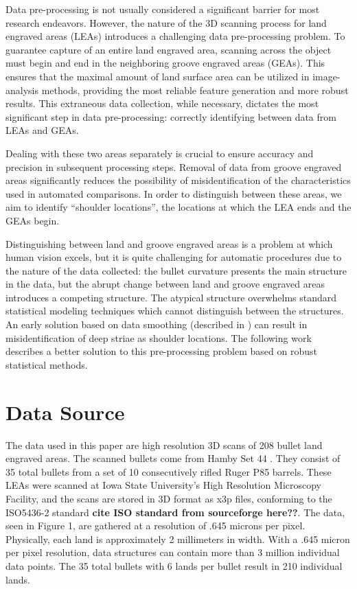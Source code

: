 \documentclass[]{article}
\begin{document}
Data pre-processing is not usually considered a significant barrier for
most research endeavors. However, the nature of the 3D scanning process
for land engraved areas (LEAs) introduces a challenging data
pre-processing problem. To guarantee capture of an entire land engraved
area, scanning across the object must begin and end in the neighboring
groove engraved areas (GEAs). This ensures that the maximal amount of
land surface area can be utilized in image-analysis methods, providing
the most reliable feature generation and more robust results. This
extraneous data collection, while necessary, dictates the most
significant step in data pre-processing: correctly identifying between
data from LEAs and GEAs.

Dealing with these two areas separately is crucial to ensure accuracy
and precision in subsequent processing steps. Removal of data from
groove engraved areas significantly reduces the possibility of
misidentification of the characteristics used in automated comparisons.
In order to distinguish between these areas, we aim to identify
``shoulder locations'', the locations at which the LEA ends and the GEAs
begin.

Distinguishing between land and groove engraved areas is a problem at
which human vision excels, but it is quite challenging for automatic
procedures due to the nature of the data collected: the bullet curvature
presents the main structure in the data, but the abrupt change between
land and groove engraved areas introduces a competing structure. The
atypical structure overwhelms standard statistical modeling techniques
which cannot distinguish between the structures. An early solution based
on data smoothing (described in \citep{Hare1}) can result in
misidentification of deep striae as shoulder locations. The following
work describes a better solution to this pre-processing problem based on
robust statistical methods.

\section{Data Source}

The data used in this paper are high resolution 3D scans of 208 bullet
land engraved areas. The scanned bullets come from Hamby Set 44
\citep{Hamby}. They consist of 35 total bullets from a set of 10
consecutively rifled Ruger P85 barrels. These LEAs were scanned at Iowa
State University's High Resolution Microscopy Facility, and the scans
are stored in 3D format as x3p files, conforming to the ISO5436-2
standard \textbf{cite ISO standard from sourceforge here??}. The data,
seen in Figure 1, are gathered at a resolution of .645 microns per
pixel. Physically, each land is approximately 2 millimeters in width.
With a .645 micron per pixel resolution, data structures can contain
more than 3 million individual data points. The 35 total bullets with 6
lands per bullet result in 210 individual lands.
\end{document}

